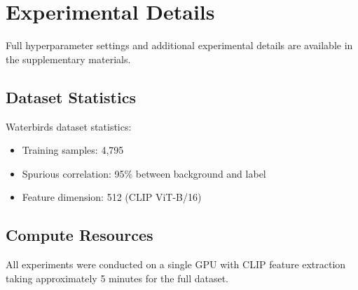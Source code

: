\section{Experimental Details}

Full hyperparameter settings and additional experimental details are available in the supplementary materials.

\subsection{Dataset Statistics}

Waterbirds dataset statistics:
\begin{itemize}
    \item Training samples: 4,795
    \item Spurious correlation: 95\% between background and label
    \item Feature dimension: 512 (CLIP ViT-B/16)
\end{itemize}

\subsection{Compute Resources}

All experiments were conducted on a single GPU with CLIP feature extraction taking approximately 5 minutes for the full dataset.
